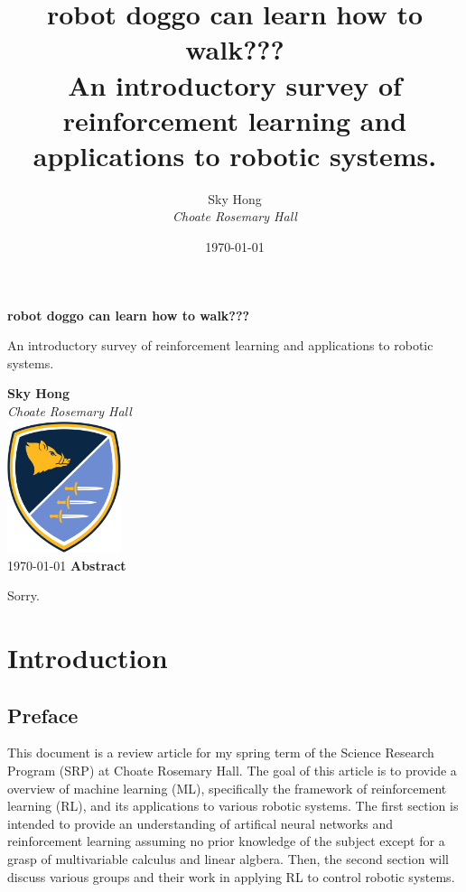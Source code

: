 \documentclass[12pt]{report}
\title{robot doggo can learn how to walk??? \\
    \large{An introductory survey of reinforcement learning and applications to robotic systems.}}
\author{Sky Hong \\
    \textit{Choate Rosemary Hall}}
\date{\today}
\theoremstyle{definition}
\theoremstyle{remark}
\begin{document}
\begin{titlepage}
    \begin{center}
        \vspace*{1cm}

        \huge
        \textbf{robot doggo can learn how to walk???}

        \vspace{0.5cm}
        \large
        An introductory survey of reinforcement learning and applications to robotic systems.

        \vfill

        \textbf{Sky Hong} \\
        \textit{Choate Rosemary Hall} \\
        \vspace{0.5cm}
        \includegraphics[width=0.25\textwidth]{figs/choate_logo.png} \\
        \vspace{0.8cm}
        \today
        \vspace{0.8cm}
        \vfill
        \textbf{Abstract}
        \vspace{0.5cm}
    \end{center}
    Sorry.
\end{titlepage}




\tableofcontents

\chapter{Introduction}
\section{Preface}
This document is a review article for my spring term of the Science Research Program (SRP) at Choate Rosemary Hall. The goal of this article is to provide a overview of machine learning (ML), specifically the framework of reinforcement learning (RL), and its applications to various robotic systems. The first section is intended to provide an understanding of artifical neural networks and reinforcement learning assuming no prior knowledge of the subject except for a grasp of multivariable calculus and linear algbera. Then, the second section will discuss various groups and their work in applying RL to control robotic systems.
\end{document}

